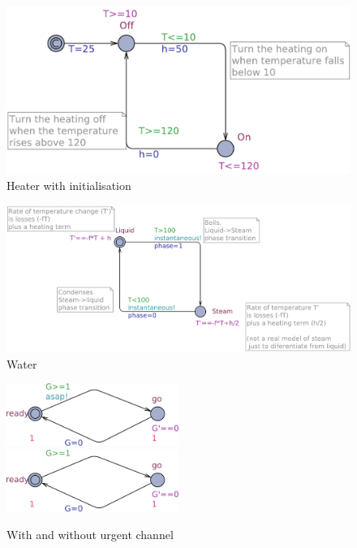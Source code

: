 \documentclass[12pt,a4paper]{article}
\begin{document}
\begin{figure}
	\centering
	\includegraphics[width=\textwidth]{Heater}
	\caption{Heater with initialisation}
\end{figure}


\begin{figure}
	\centering
	\includegraphics[width=\textwidth]{Water}
	\caption{Water }
\end{figure}

\begin{figure}\centering
	\includegraphics[width=0.5\textwidth]{Template-crop}\\[1in]
	\includegraphics[width=0.5\textwidth]{template-crop}

	\caption{With and without urgent channel}
\end{figure}
\end{document}
